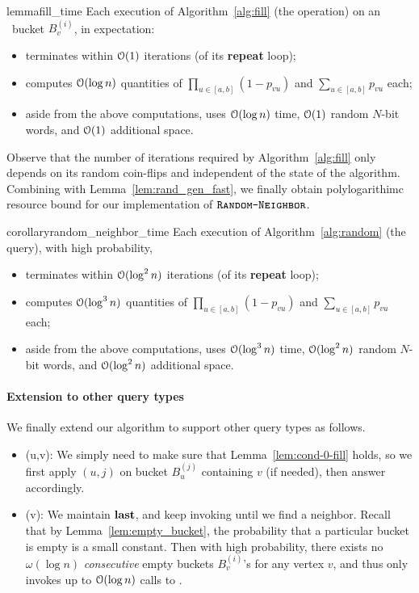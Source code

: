 \begin{restatable}{lemma}{fill_time}
\label{lem:fill_time}
Each execution of Algorithm~\ref{alg:fill} (the  operation) on an \unfilled~bucket $B_v^{(i)}$, in expectation:
\begin{itemize}
\item terminates within $\mathcal{O}(1)$ iterations (of its \textup{\textbf{repeat}} loop);
\item computes $\mathcal{O}(\log n)$ quantities of $\prod_{u \in [a,b]} (1-p_{vu})$ and $\sum_{u\in[a,b]} p_{vu}$ each;
\item aside from the above computations, uses $\mathcal{O}(\log n)$ time, $\mathcal{O}(1)$ random $N$-bit words, and $\mathcal{O}(1)$ additional space.
\end{itemize}
\end{restatable}

Observe that the number of iterations required by Algorithm~\ref{alg:fill} only depends on its random coin-flips and independent of the state of the algorithm.
Combining with Lemma~\ref{lem:rand_gen_fast}, we finally obtain polylogarithimc resource bound for our implementation of $\texttt{\textsc{Random-Neighbor}}$.

\begin{restatable}{corollary}{random_neighbor_time}
\label{cor:random_neighbor_time}
Each execution of Algorithm~\ref{alg:random} (the  query), with high probability,
\begin{itemize}
\item terminates within $\mathcal{O}(\log^2 n)$ iterations (of its \textup{\textbf{repeat}} loop);
\item computes $\mathcal{O}(\log^3 n)$ quantities of $\prod_{u \in [a,b]} (1-p_{vu})$ and $\sum_{u\in[a,b]} p_{vu}$ each;
\item aside from the above computations, uses $\mathcal{O}(\log^3 n)$ time, $\mathcal{O}(\log^2 n)$ random $N$-bit words, and $\mathcal{O}(\log^2 n)$ additional space.
\end{itemize}
\end{restatable}

\paragraph*{Extension to other query types}
We finally extend our algorithm to support other query types as follows.
\begin{itemize}
\item {}(u,v): We simply need to make sure that Lemma~\ref{lem:cond-0-fill} holds, so we first apply $(u,j)$ on bucket $B_u^{(j)}$ containing $v$ (if needed), then answer accordingly.
\item {}(v): We maintain $\mathbf{last}$, and keep invoking  until we find a neighbor. Recall that by Lemma~\ref{lem:empty_bucket}, the probability that a particular bucket is empty is a small constant. Then with high probability, there exists no $\omega(\log n)$ \emph{consecutive} empty buckets $B_v^{(i)}$'s for any vertex $v$, and thus  only invokes up to $\mathcal{O}(\log n)$ calls to .
\end{itemize}

